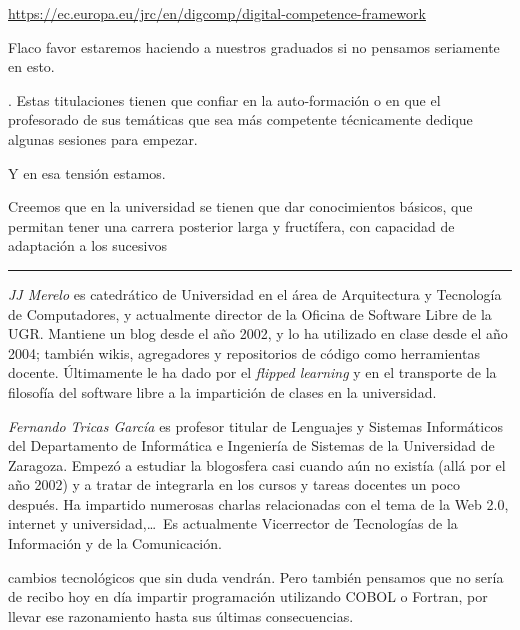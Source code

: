 \documentclass[twoside,10pt]{article}
\newcounter{num}
\begin{document}
\begin{multicols}{2}
{\url{https://ec.europa.eu/jrc/en/digcomp/digital-competence-framework}
	
Flaco favor estaremos haciendo a nuestros graduados si no pensamos seriamente en esto.}. 
Estas titulaciones tienen que confiar en la auto-formación o en que el
profesorado de sus temáticas que sea más competente técnicamente
dedique algunas sesiones para empezar.

Y en esa tensión estamos.

Creemos que en la universidad se tienen que dar conocimientos básicos,
que permitan tener una carrera posterior larga y fructífera,
  con
capacidad de adaptación a los sucesivos 

\noindent\rule{86mm}{1pt}
\vspace{1ex} {\small{\begin{window} 
\noindent\emph{JJ Merelo} es catedrático de Universidad
en el área de Arquitectura y Tecnología de Computadores, y
actualmente director de la Oficina de Software Libre de la UGR.
Mantiene un blog desde el año 2002, y lo ha utilizado en clase desde
el año 2004; también wikis, agregadores y repositorios de código
como herramientas docente. Últimamente le ha dado por el \textsl{flipped
learning} y en el transporte de la filosofía del software libre a la
impartición de clases en la universidad.
\end{window}}}

\medskip

{\small{\begin{window}
		\noindent \emph{Fernando Tricas García} es profesor
		titular de Lenguajes y Sistemas Informáticos del Departamento
		de Informática e Ingeniería de Sistemas de la Universidad de
		Zaragoza.  Empezó a estudiar la blogosfera casi cuando aún no
		existía (allá por el año 2002) y a tratar de integrarla en los
		cursos y tareas docentes un poco después.  Ha impartido
		numerosas charlas relacionadas con el tema de la Web 2.0, 
		internet y universidad,\ldots\ 
		Es actualmente Vicerrector de Tecnologías de la Información y
de la Comunicación.   
		\end{window}}}




\noindent 
\bigskip

cambios tecnológicos que sin duda vendrán. 
Pero también pensamos que no sería de recibo hoy en día
impartir programación utilizando COBOL o Fortran, por llevar
ese razonamiento hasta sus últimas consecuencias. 



\end{multicols}
\end{document}
